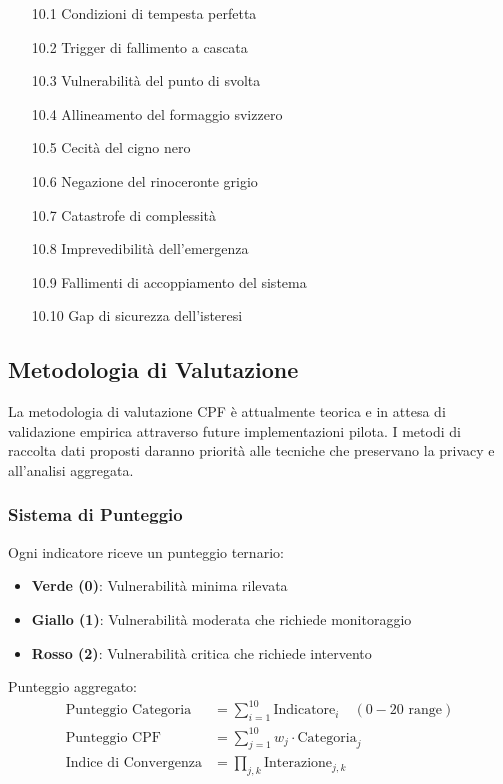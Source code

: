 \documentclass[11pt,a4paper]{article}
\begin{document}
\begin{enumerate}
\item[10.1] Condizioni di tempesta perfetta
\item[10.2] Trigger di fallimento a cascata
\item[10.3] Vulnerabilità del punto di svolta
\item[10.4] Allineamento del formaggio svizzero
\item[10.5] Cecità del cigno nero
\item[10.6] Negazione del rinoceronte grigio
\item[10.7] Catastrofe di complessità
\item[10.8] Imprevedibilità dell'emergenza
\item[10.9] Fallimenti di accoppiamento del sistema
\item[10.10] Gap di sicurezza dell'isteresi
\end{enumerate}

\subsection{Metodologia di Valutazione}

La metodologia di valutazione CPF è attualmente teorica e in attesa di validazione empirica attraverso future implementazioni pilota. I metodi di raccolta dati proposti daranno priorità alle tecniche che preservano la privacy e all'analisi aggregata.

\subsubsection{Sistema di Punteggio}

Ogni indicatore riceve un punteggio ternario:
\begin{itemize}
\item \textbf{Verde (0)}: Vulnerabilità minima rilevata
\item \textbf{Giallo (1)}: Vulnerabilità moderata che richiede monitoraggio
\item \textbf{Rosso (2)}: Vulnerabilità critica che richiede intervento
\end{itemize}

Punteggio aggregato:
\begin{align}
\text{Punteggio Categoria} &= \sum_{i=1}^{10} \text{Indicatore}_i \quad (0-20 \text{ range}) \\
\text{Punteggio CPF} &= \sum_{j=1}^{10} w_j \cdot \text{Categoria}_j \\
\text{Indice di Convergenza} &= \prod_{j,k} \text{Interazione}_{j,k}
\end{align}
\end{document}
